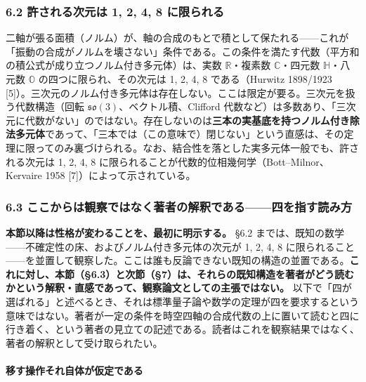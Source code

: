 \documentclass[
]{ltjsarticle}
\begin{document}
\subsubsection{6.2 許される次元は 1, 2, 4, 8
に限られる}\label{ux8a31ux3055ux308cux308bux6b21ux5143ux306f-1-2-4-8-ux306bux9650ux3089ux308cux308b}

二軸が張る面積（ノルム）が、軸の合成のもとで積として保たれる------これが「振動の合成がノルムを壊さない」条件である。この条件を満たす代数（平方和の積公式が成り立つノルム付き多元体）は、実数
\(\mathbb{R}\)・複素数 \(\mathbb{C}\)・四元数 \(\mathbb{H}\)・八元数
\(\mathbb{O}\) の四つに限られ、その次元は 1, 2, 4, 8 である（Hurwitz
1898/1923
{[}5{]}）。三次元のノルム付き多元体は存在しない。ここは限定が要る。三次元を扱う代数構造（回転
\(\mathfrak{so}(3)\)、ベクトル積、Clifford
代数など）は多数あり、「三次元に代数がない」のではない。存在しないのは\textbf{三本の実基底を持つノルム付き除法多元体}であって、「三本では（この意味で）閉じない」という直感は、その定理に限ってのみ裏づけられる。なお、結合性を落とした実多元体一般でも、許される次元は
1, 2, 4, 8 に限られることが代数的位相幾何学（Bott--Milnor、Kervaire 1958
{[}7{]}）によって示されている。

\subsubsection{6.3
ここからは観察ではなく著者の解釈である------四を指す読み方}\label{ux3053ux3053ux304bux3089ux306fux89b3ux5bdfux3067ux306fux306aux304fux8457ux8005ux306eux89e3ux91c8ux3067ux3042ux308bux56dbux3092ux6307ux3059ux8aadux307fux65b9}

\textbf{本節以降は性格が変わることを、最初に明示する。} §6.2
までは、既知の数学------不確定性の床、およびノルム付き多元体の次元が 1,
2, 4, 8
に限られること------を並置して観察した。ここは誰も反論できない既知の構造の並置である。\textbf{これに対し、本節（§6.3）と次節（§7）は、それらの既知構造を著者がどう読むかという解釈・直感であって、観察論文としての主張ではない。}
以下で「四が選ばれる」と述べるとき、それは標準量子論や数学の定理が四を要求するという意味ではない。著者が一定の条件を時空四軸の合成代数の上に置いて読むと四に行き着く、という著者の見立ての記述である。読者はこれを観察結果ではなく、著者の解釈として受け取られたい。

\paragraph{移す操作それ自体が仮定である}\label{ux79fbux3059ux64cdux4f5cux305dux308cux81eaux4f53ux304cux4eeeux5b9aux3067ux3042ux308b}
\end{document}

